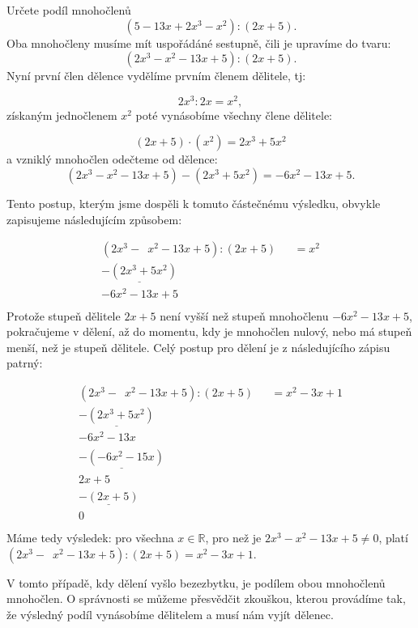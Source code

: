 \documentclass[12pt,a4paper]{article}
\begin{document}
\begin{examplebox}
Určete podíl mnohočlenů
\[
(5 - 13x + 2x^3 - x^2) : (2x + 5).
\]
Oba mnohočleny musíme mít uspořádáné sestupně, čili je upravíme do tvaru:
\[
(2x^3 - x^2 - 13x + 5) : (2x + 5).
\]
Nyní první člen dělence vydělíme prvním členem dělitele, tj:

\[
2x^3 : 2x = x^2,
\]
získaným jednočlenem $x^2$ poté vynásobíme všechny člene dělitele:

\[
(2x + 5)\cdot(x^2)=2x^3 + 5x^2
\]
a vzniklý mnohočlen odečteme od dělence:
\[
(2x^3 - x^2 - 13x + 5)-(2x^3 + 5x^2) = -6x^2 - 13x + 5.
\]

Tento postup, kterým jsme dospěli k tomuto částečnému výsledku, obvykle zapisujeme následujícím způsobem:

\[
\begin{array}{rl}
    (2x^3 - \phantom{5}x^2 - 13x + 5) : (2x + 5) &= x^2 \\
    \underline{-(2x^3 + 5x^2)} \phantom{- 13x + 5) : (2x + 5) } & \\
    -6x^2 - 13x + 5 \phantom{) : (2x + 5) } & \\
\end{array}    
\]
Protože stupeň dělitele $2x + 5$ není vyšší než stupeň mnohočlenu $-6x^2 - 13x + 5$, pokračujeme v dělení,
až do momentu, kdy je mnohočlen nulový, nebo má stupeň menší, než je stupeň dělitele. Celý postup pro dělení
je z následujícího zápisu patrný:

\[
\begin{array}{rl}
    (2x^3 - \phantom{5}x^2 - 13x + 5) : (2x + 5) &= x^2 - 3x +1 \\
    \underline{-(2x^3 + 5x^2)} \phantom{- 13x + 5) : (2x + 5) } & \\
    -6x^2 - 13x \phantom{\;+ 5) : (2x + 5) } & \\
    \underline{-(-6x^2 -15x)} \phantom{ + 5) : (2x + 5) } & \\
    2x+5 \phantom{): (2x + 5) } & \\
    \underline{-(2x+5)} \phantom{)) (2x + 5) } & \\
    0 \phantom{): (2x + 5) } & \\
\end{array}    
\]
Máme tedy výsledek: pro všechna $x\in \mathbb{R}$, pro než je $2x^3 - x^2 - 13x + 5 \neq 0$, platí
$(2x^3 - \phantom{5}x^2 - 13x + 5) : (2x + 5) = x^2 - 3x +1$.
\end{examplebox}

V tomto případě, kdy dělení vyšlo bezezbytku, je podílem obou mnohočlenů mnohočlen. O správnosti se můžeme přesvědčit zkouškou,
kterou provádíme tak, že výsledný podíl vynásobíme dělitelem a musí nám vyjít dělenec.
\end{document}
